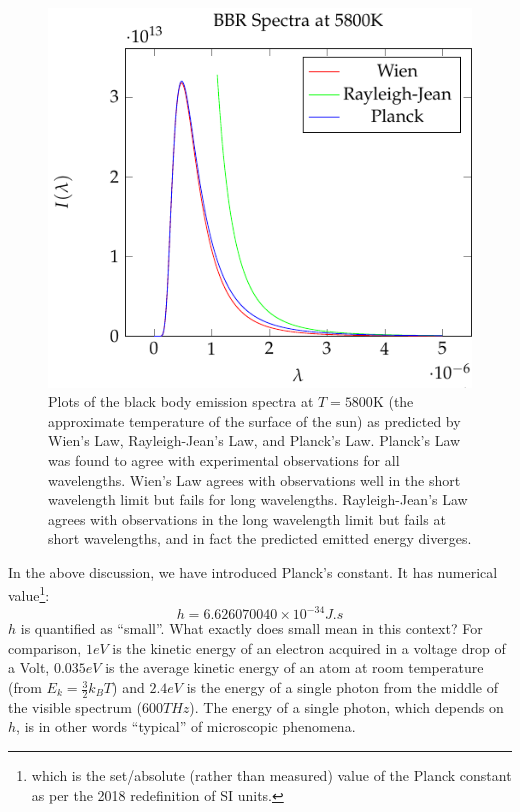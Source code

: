 \begin{figure}[htbp]
    \centering
    \includegraphics[]{Images/fig-BBRspectra.pdf}
    \caption{Plots of the black body emission spectra at $T = 5800\mathrm{K}$ (the approximate temperature of the surface of the sun) as predicted by Wien's Law, Rayleigh-Jean's Law, and Planck's Law. Planck's Law was found to agree with experimental observations for all wavelengths. Wien's Law agrees with observations well in the short wavelength limit but fails for long wavelengths. Rayleigh-Jean's Law agrees with observations in the long wavelength limit but fails at short wavelengths, and in fact the predicted emitted energy diverges.}
    \label{fig-BBRspectra}
\end{figure}


\noindent
In the above discussion, we have introduced Planck's constant. It has numerical value\footnote{which is the set/absolute (rather than measured) value of the Planck constant as per the 2018 redefinition of SI units.}:
\begin{equation}
    h = 6.626070040 \times 10^{-34}\si{J.s}
\end{equation}
$h$ is quantified as ``small''. What exactly does small mean in this context? For comparison, $1\si{eV}$ is the kinetic energy of an electron acquired in a voltage drop of a Volt, $0.035\si{eV}$ is the average kinetic energy of an atom at room temperature (from $E_k = \frac{3}{2}k_B T$) and $2.4\si{eV}$ is the energy of a single photon from the middle of the visible spectrum ($600 \si{THz}$). The energy of a single photon, which depends on $h$, is in other words ``typical'' of microscopic phenomena.


